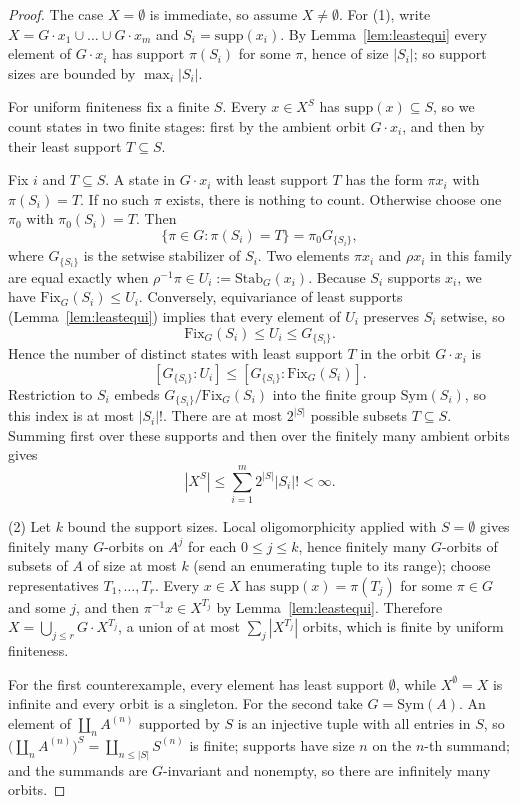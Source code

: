 \documentclass{lmcs}
\newcommand{\Sym}{\mathrm{Sym}}
\newcommand{\Fix}{\mathrm{Fix}}
\newcommand{\supp}{\mathrm{supp}}
\begin{document}
\begin{proof}
The case $X=\emptyset$ is immediate, so assume $X\neq\emptyset$.
For (1), write $X=G\cdot x_1\cup\dots\cup G\cdot x_m$ and
$S_i=\supp(x_i)$. By Lemma~\ref{lem:leastequi} every element of
$G\cdot x_i$ has support $\pi(S_i)$ for some $\pi$, hence of size
$|S_i|$; so support sizes are bounded by $\max_i|S_i|$.

For uniform finiteness fix a finite $S$. Every $x\in X^S$ has
$\supp(x)\subseteq S$, so we count states in two finite stages: first by
the ambient orbit $G\cdot x_i$, and then by their least support
$T\subseteq S$.

Fix $i$ and $T\subseteq S$. A state in $G\cdot x_i$ with least support
$T$ has the form $\pi x_i$ with $\pi(S_i)=T$. If no such $\pi$ exists,
there is nothing to count. Otherwise choose one $\pi_0$ with
$\pi_0(S_i)=T$. Then
\[
   \{\pi\in G:\pi(S_i)=T\}=\pi_0G_{\{S_i\}},
\]
where $G_{\{S_i\}}$ is the setwise stabilizer of $S_i$. Two elements
$\pi x_i$ and $\rho x_i$ in this family are equal exactly when
$\rho^{-1}\pi\in U_i:=\mathrm{Stab}_G(x_i)$. Because $S_i$ supports
$x_i$, we have $\Fix_G(S_i)\leq U_i$. Conversely, equivariance of least
supports (Lemma~\ref{lem:leastequi}) implies that every element of $U_i$
preserves $S_i$ setwise, so
\[
   \Fix_G(S_i)\leq U_i\leq G_{\{S_i\}}.
\]
Hence the number of distinct states with least support $T$ in the orbit
$G\cdot x_i$ is
\[
   [G_{\{S_i\}}:U_i]
   \leq [G_{\{S_i\}}:\Fix_G(S_i)].
\]
Restriction to $S_i$ embeds
$G_{\{S_i\}}/\Fix_G(S_i)$ into the finite group $\Sym(S_i)$, so this
index is at most $|S_i|!$. There are at most $2^{|S|}$ possible subsets
$T\subseteq S$. Summing first over these supports and then over the
finitely many ambient orbits gives
\[
   |X^S|\leq \sum_{i=1}^{m}2^{|S|}|S_i|!<\infty.
\]

(2) Let $k$ bound the support sizes. Local oligomorphicity applied with
$S=\emptyset$ gives finitely many $G$-orbits on $A^{j}$ for each
$0\leq j\leq k$, hence finitely many $G$-orbits of subsets of $A$ of
size at most $k$ (send an enumerating tuple to its range); choose
representatives $T_1,\dots,T_r$. Every $x\in X$ has
$\supp(x)=\pi(T_j)$ for some $\pi\in G$ and some $j$, and then
$\pi^{-1}x\in X^{T_j}$ by Lemma~\ref{lem:leastequi}. Therefore
$X=\bigcup_{j\leq r}G\cdot X^{T_j}$, a union of at most
$\sum_j|X^{T_j}|$ orbits, which is finite by uniform finiteness.

For the first counterexample, every element has least support
$\emptyset$, while $X^{\emptyset}=X$ is infinite and every orbit is a
singleton. For the second take $G=\Sym(A)$. An element of
$\coprod_n A^{(n)}$ supported by $S$
is an injective tuple with all entries in $S$, so
$\bigl(\coprod_n A^{(n)}\bigr)^{S}=\coprod_{n\leq|S|}S^{(n)}$ is finite;
supports have size $n$ on the $n$-th summand; and the summands are
$G$-invariant and nonempty, so there are infinitely many orbits.
\end{proof}
\end{document}
